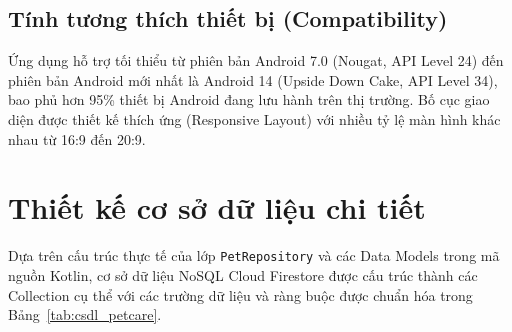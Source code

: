 \subsection{Tính tương thích thiết bị (Compatibility)}
Ứng dụng hỗ trợ tối thiểu từ phiên bản Android 7.0 (Nougat, API Level 24) đến phiên bản Android mới nhất là Android 14 (Upside Down Cake, API Level 34), bao phủ hơn 95\% thiết bị Android đang lưu hành trên thị trường. Bố cục giao diện được thiết kế thích ứng (Responsive Layout) với nhiều tỷ lệ màn hình khác nhau từ 16:9 đến 20:9.

\section{Thiết kế cơ sở dữ liệu chi tiết}
\label{sec:thiet_ke_csdl}

Dựa trên cấu trúc thực tế của lớp \texttt{PetRepository} và các Data Models trong mã nguồn Kotlin, cơ sở dữ liệu NoSQL Cloud Firestore được cấu trúc thành các Collection cụ thể với các trường dữ liệu và ràng buộc được chuẩn hóa trong Bảng~\ref{tab:csdl_petcare}.

